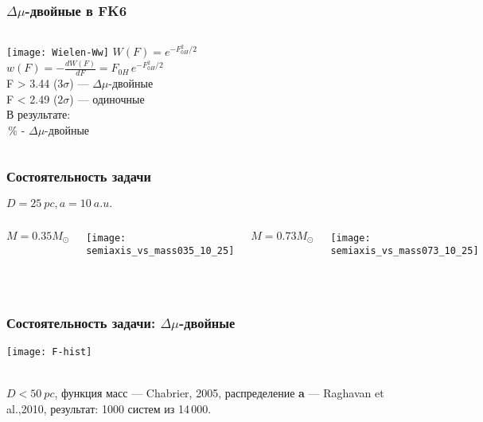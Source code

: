 \begin{frame}%
\frametitle{$\Delta\mu$-двойные в FK6}
\begin{columns}
		\texttt{[image: Wielen-Ww]}
		{\footnotesize $W(F) = e^{-F^2_{0H}/2}$}\\
		{\footnotesize $w(F) = -\frac{dW(F)}{dF} = F_{0H}\,e^{-F^2_{0H}/2}$}\\
		{\footnotesize F > 3.44 ($3\sigma$) --- $\Delta\mu$-двойные}\\
		{\footnotesize F < 2.49 ($2\sigma$) --- одиночные}\\
		{\footnotesize В результате:\\ \,\%  - $\Delta\mu$-двойные}\\
\end{columns}
\end{frame}

\begin{frame}%
\frametitle{Состоятельность задачи}
\begin{center}
{\footnotesize $D=25~pc, a=10~a.u.$}
\end{center}
\begin{columns}
	\begin{center}
	{\footnotesize $M = 0.35M_\odot$}
	\end{center} 
	\texttt{[image: semiaxis\_vs\_mass035\_10\_25]}
 \begin{center}
	{\footnotesize $M = 0.73M_\odot$}
	\end{center} 
	\texttt{[image: semiaxis\_vs\_mass073\_10\_25]}
\end{columns}
\\ 
\end{frame}



\begin{frame}%
\frametitle{Состоятельность задачи: {\small $\Delta\mu$-двойные}}
\begin{center}
\texttt{[image: F-hist]}
\end{center}
\begin{center}
{\footnotesize \\ $D<50~pc$, функция масс --- Chabrier, 2005, распределение \textbf{a} --- Raghavan et al.,2010, результат: 1000 систем из 14\,000.}
\end{center}
\end{frame}


